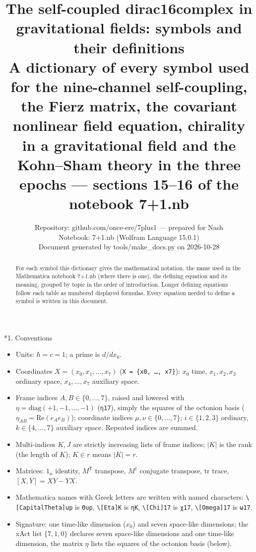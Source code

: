 \documentclass[10pt,a4paper]{article}
\makeatletter
\renewcommand\section{\@startsection{section}{1}{\z@}{-3.5ex \@plus -1ex \@minus -.2ex}{2.3ex \@plus.2ex}{\normalfont\Large\bfseries\raggedright}}
\makeatother
\begin{document}
\title{The self-coupled dirac16complex in gravitational fields: symbols and their definitions\\[0.4em]\large A dictionary of every symbol used for the nine-channel self-coupling, the Fierz matrix, the covariant nonlinear field equation, chirality in a gravitational field and the Kohn–Sham theory in the three epochs — sections 15–16 of the notebook 7+1.nb}
\author{Repository: github.com/once-ere/7plus1 — prepared for Nash\\ Notebook: 7+1.nb (Wolfram Language 15.0.1)\\ Document generated by tools/make\_docs.py on 2026-10-28}
\date{}
\maketitle
\begin{abstract}
For each symbol this dictionary gives the mathematical notation, the name used in the Mathematica notebook 7+1.nb (where there is one), the defining equation and its meaning, grouped by topic in the order of introduction. Longer defining equations follow each table as numbered displayed formulas. Every equation needed to define a symbol is written in this document.
\end{abstract}
\tableofcontents
{}\section*{1. Conventions}
\begin{itemize}
\item Units: $\hbar=c=1$; a prime is $d/dx_0$.
\item Coordinates $X=(x_0,x_1,\dots,x_7)$ (\texttt{X = \{x0, …, x7\}}): $x_0$ time, $x_1,x_2,x_3$ ordinary space, $x_4,\dots,x_7$ auxiliary space.
\item Frame indices $A,B\in\lbrace0,\dots,7\rbrace$, raised and lowered with $\eta=\mathrm{diag}(+1,-1,\dots,-1)$ (\texttt{η17}), simply the squares of the octonion basis ($\eta_{AB}=\mathrm{Re}(e_Ae_B)$); coordinate indices $\mu,\nu\in\lbrace0,\dots,7\rbrace$; $i\in\lbrace1,2,3\rbrace$ ordinary, $k\in\lbrace4,\dots,7\rbrace$ auxiliary space. Repeated indices are summed.
\item Multi-indices $K,J$ are strictly increasing lists of frame indices; $|K|$ is the rank (the length of $K$); $K\in r$ means $|K|=r$.
\item Matrices: $1_n$ identity, $M^{\mathsf T}$ transpose, $M^\dagger$ conjugate transpose, $\mathrm{tr}$ trace, $[X,Y]=XY-YX$.
\item Mathematica names with Greek letters are written with named characters: \texttt{\textbackslash{}\allowbreak{}[CapitalTheta]up} is \texttt{Θup}, \texttt{\textbackslash{}\allowbreak{}[Eta]K} is \texttt{ηK}, \texttt{\textbackslash{}\allowbreak{}[Chi]17} is \texttt{χ17}, \texttt{\textbackslash{}\allowbreak{}[Omega]17} is \texttt{ω17}.
\item Signature: one time-like dimension ($x_0$) and seven space-like dimensions; the xAct list $\{7,1,0\}$ declares seven space-like dimensions and one time-like dimension, the matrix $\eta$ lists the squares of the octonion basis (below).
\end{itemize}
\end{document}
